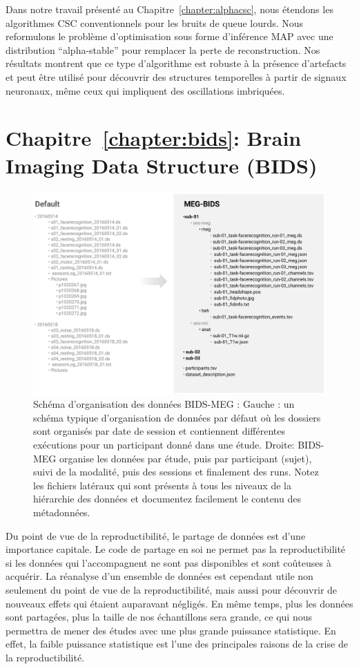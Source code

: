 Dans notre travail présenté au Chapitre~\ref{chapter:alphacsc},  nous étendons les algorithmes CSC conventionnels pour les bruits de queue lourds. Nous reformulons le problème d'optimisation sous forme d'inférence MAP avec une distribution “alpha-stable” pour remplacer la perte de reconstruction. Nos résultats montrent que ce type d'algorithme est robuste à la présence d'artefacts et peut être utilisé pour découvrir des structures temporelles à partir de signaux neuronaux, même ceux qui impliquent des oscillations imbriquées.

\section*{Chapitre~\ref{chapter:bids}: Brain Imaging Data Structure (BIDS)}

\begin{figure}[htb!]
\begin{center}
   \includegraphics[width=\linewidth]{figures/bids_organization.png}
\end{center}
   \caption[]{Schéma d'organisation des données BIDS-MEG : Gauche : un schéma typique d'organisation de données par défaut où les dossiers sont organisés par date de session et contiennent différentes exécutions pour un participant donné dans une étude. Droite: BIDS-MEG organise les données par étude, puis par participant (sujet), suivi de la modalité, puis des sessions et finalement des runs. Notez les fichiers latéraux qui sont présents à tous les niveaux de la hiérarchie des données et documentez facilement le contenu des métadonnées.}
   \label{fig:sommaire:BIDS-MEG-organization}
\end{figure}
Du point de vue de la reproductibilité, le partage de données est d'une importance capitale. Le code de partage en soi ne permet pas la reproductibilité si les données qui l'accompagnent ne sont pas disponibles et sont coûteuses à acquérir. La réanalyse d'un ensemble de données est cependant utile non seulement du point de vue de la reproductibilité, mais aussi pour découvrir de nouveaux effets qui étaient auparavant négligés. En même temps, plus les données sont partagées, plus la taille de nos échantillons sera grande, ce qui nous permettra de mener des études avec une plus grande puissance statistique. En effet, la faible puissance statistique est l'une des principales raisons de la crise de la reproductibilité.

